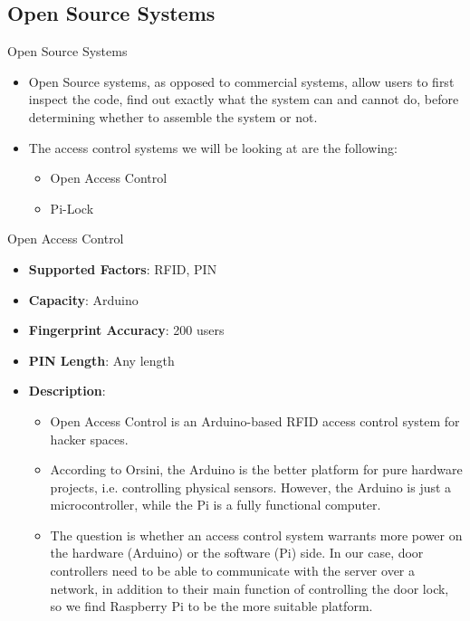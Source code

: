 \subsection{Open Source Systems}
\begin{frame}{Open Source Systems}
\begin{itemize}
    \item<1-> Open Source systems, as opposed to commercial systems, allow users to first inspect the code, find out exactly what the system can and cannot do, before determining whether to assemble the system or not.
    \item<2-> The access control systems we will be looking at are the following:
    \begin{itemize}
    	\item<3-> Open Access Control
    	\item<4-> Pi-Lock
    \end{itemize}
\end{itemize}
\end{frame}

\begin{frame}{Open Access Control}
\begin{itemize}
    \item<1-> \textbf{Supported Factors}: RFID, PIN
    \item<2-> \textbf{Capacity}: Arduino
    \item<3-> \textbf{Fingerprint Accuracy}: 200 users
    \item<4-> \textbf{PIN Length}: Any length
    \item<5-> \textbf{Description}:
    \begin{itemize}
	    \item<6-> \scriptsize{Open Access Control is an Arduino-based RFID access control system for hacker spaces.}
	    \item<7-> \scriptsize{According to Orsini, the Arduino is the better platform for pure hardware projects, i.e. controlling physical sensors. However, the Arduino is just a microcontroller, while the Pi is a fully functional computer.}
	    \item<8-> \scriptsize{The question is whether an access control system warrants more power on the hardware (Arduino) or the software (Pi) side. In our case, door controllers need to be able to communicate with the server over a network, in addition to their main function of controlling the door lock, so we find Raspberry Pi to be the more suitable platform.} 
	\end{itemize}
\end{itemize}
\end{frame}

